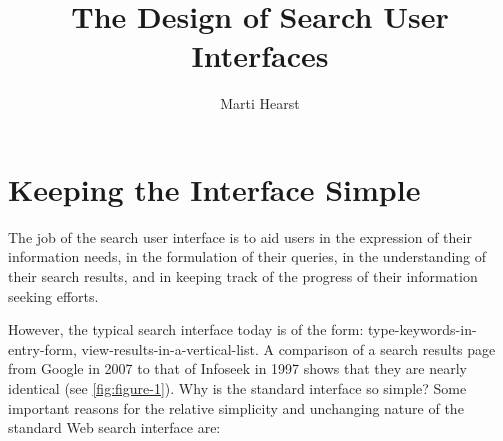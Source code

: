 \documentclass[sigconf,nonacm,screen,pbalance]{acmart}
\begin{document}
\title{The Design of Search User Interfaces}
\author{Marti Hearst}
\maketitle

\setcounter{tocdepth}{1}
\renewcommand*\contentsname{Chapter Content}
\tableofcontents
\vspace{-35pt}

\section{Keeping the Interface Simple}

The job of the search user interface is to aid users in the expression of their information needs, in the
formulation of their queries, in the understanding of their search results, and in keeping track of the
progress of their information seeking efforts.

However, the typical search interface today is of the form: type-keywords-in-entry-form,
view-results-in-a-vertical-list. A comparison of a search results page from Google in 2007 to that of
Infoseek in 1997 shows that they are nearly identical (see \autoref{fig:figure-1}). Why is the
standard interface so simple? Some important reasons for the relative simplicity and unchanging nature of
the standard Web search interface are:
\end{document}
